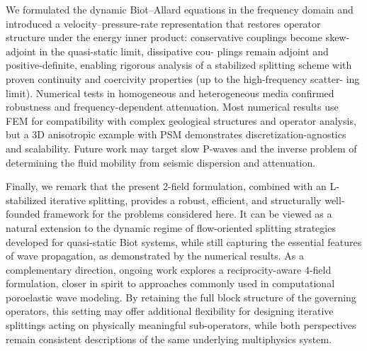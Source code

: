 \documentclass[pdflatex,sn-mathphys-num]{sn-jnl}
\theoremstyle{thmstyleone}%
\theoremstyle{thmstyletwo}%
\theoremstyle{thmstylethree}%
\theoremstyle{definition}
\begin{document}
	We formulated the dynamic Biot–Allard equations in the frequency domain and introduced
	a velocity–pressure-rate representation that restores operator structure under the energy inner
	product: conservative couplings become skew-adjoint in the quasi-static limit, dissipative cou-
	plings remain adjoint and positive-definite, enabling rigorous analysis of a stabilized splitting
	scheme with proven continuity and coercivity properties (up to the high-frequency scatter-
	ing limit). Numerical tests in homogeneous and heterogeneous media confirmed robustness
	and frequency-dependent attenuation. Most numerical results use FEM for compatibility with
	complex geological structures and operator analysis, but a 3D anisotropic example with PSM
	demonstrates discretization-agnostics and scalability. Future work may target slow P-waves and
	the inverse problem of determining the fluid mobility from seismic dispersion and attenuation.
	
	Finally, we remark that the present 2-field formulation, combined with an L-stabilized iterative splitting, provides a robust, efficient, and structurally well-founded framework for the problems considered here. It can be viewed as a natural extension to the dynamic regime of flow-oriented splitting strategies developed for quasi-static Biot systems, while still capturing the essential features of wave propagation, as demonstrated by the numerical results. As a complementary direction, ongoing work explores a reciprocity-aware 4-field formulation, closer in spirit to approaches commonly used in computational poroelastic wave modeling. By retaining the full block structure of the governing operators, this setting may offer additional flexibility for designing iterative splittings acting on physically meaningful sub-operators, while both perspectives remain consistent descriptions of the same underlying multiphysics system.
\FloatBarrier
	
	
	
	
\end{document}
